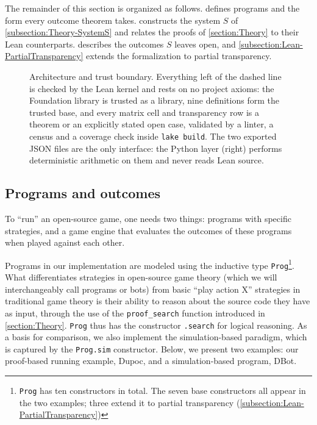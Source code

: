 \documentclass[twoside,11pt]{article}
\begin{document}
The remainder of this section is organized as follows.  defines programs and the form every outcome theorem takes.  constructs the system $S$ of \cref{subsection:Theory-SystemS} and relates the proofs of \cref{section:Theory} to their Lean counterparts.  describes the outcomes $S$ leaves open, and \cref{subsection:Lean-PartialTransparency} extends the formalization to partial transparency.

\begin{figure}[t]
  \centering
  \resizebox{\textwidth}{!}{}
  \caption{Architecture and trust boundary. Everything left of the dashed line is checked by the Lean kernel and rests on no project axioms: the Foundation library is trusted as a library, nine definitions form the trusted base, and every matrix cell and transparency row is a theorem or an explicitly stated open case, validated by a linter, a census and a coverage check inside \texttt{lake build}. The two exported JSON files are the only interface: the Python layer (right) performs deterministic arithmetic on them and never reads Lean source.}
  \label{fig:architecture}
\end{figure}

\subsection{Programs and outcomes}
\label{subsection:Lean-ProgramsOutcomes}
To \enquote{run} an open-source game, one needs two things: programs with specific strategies, and a game engine that evaluates the outcomes of these programs when played against each other. 

Programs in our implementation are modeled using the inductive type \texttt{Prog}\footnote{\texttt{Prog} has ten constructors in total. The seven base constructors all appear in the two examples; three extend it to partial transparency (\cref{subsection:Lean-PartialTransparency})}. What differentiates strategies in open-source game theory (which we will interchangeably call programs or bots) from basic \enquote{play action X} strategies in traditional game theory is their ability to reason about the source code they have as input, through the use of the \texttt{proof\_search} function introduced in \cref{section:Theory}. \texttt{Prog} thus has the constructor \texttt{.search} for logical reasoning. As a basis for comparison, we also implement the simulation-based paradigm, which is captured by the \texttt{Prog.sim} constructor. Below, we present two examples: our proof-based running example, Dupoc, and a simulation-based program, DBot.
\end{document}
